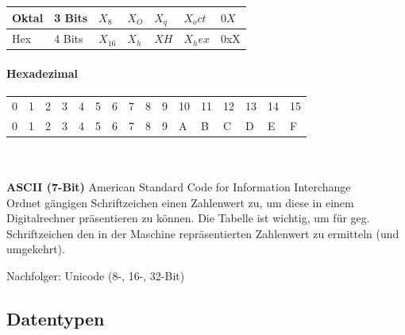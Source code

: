 		\begin{tabular}{|l|llllll|}
			\hline
			Oktal & 3 Bits & $X_8$ & $X_O$ & $X_q$ & $X_oct$ & $0X$ \\
			\hline
			Hex & 4 Bits   & $X_16$ & $X_h$ & $XH$ & $X_hex$ & 0xX \\
			\hline
		\end{tabular}

		\paragraph{Hexadezimal}
			\begin{tabular}{llllllllllllllll}
				0 & 1 & 2 & 3 & 4 & 5 & 6 & 7 & 8 & 9 & 10 & 11 & 12 & 13 & 14 & 15 \\
				0 & 1 & 2 & 3 & 4 & 5 & 6 & 7 & 8 & 9 & A & B & C & D & E & F \\
			\end{tabular}
		\\
		\\
		\textbf{ASCII (7-Bit)} American Standard Code for Information Interchange\\
			Ordnet gängigen Schriftzeichen einen Zahlenwert zu, um diese in einem Digitalrechner präsentieren zu können.
			Die Tabelle ist wichtig, um für geg. Schriftzeichen den in der Maschine repräsentierten Zahlenwert zu ermitteln (und umgekehrt).

			Nachfolger: Unicode (8-, 16-, 32-Bit)
	
	\subsection{Datentypen}
